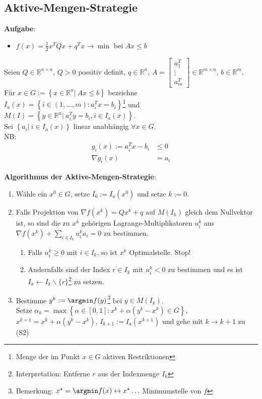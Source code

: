 \subsection{Aktive-Mengen-Strategie}
\textbf{Aufgabe}:
\begin{itemize}
  \item[] $f(x) = \frac12 x^TQx+q^Tx\rightarrow\min$ bei $Ax\le b$
\end{itemize}
Seien $Q\in\mathbb{R}^{n\times n}$, $Q>0$ possitiv definit, $q\in\mathbb{R}^n$, $A=\begin{bmatrix}a_1^T\\\vdots\\ a_m^T\end{bmatrix}\in\mathbb{R}^{m\times n}$, $b\in\mathbb{R}^m$.\\
Für $x\in G:=\left\{x\in\mathbb{R}^n|\ Ax\le b \right\}$ bezeichne $I_a(x)=\left\{i\in(1,\ldots,m):a_i^Tx=b_i\right\}$\footnote{Menge der im Punkt $x\in G$ aktiven Restriktionen} und
$M(I) = \left\{y\in\mathbb{R}^n|\ a_i^Ty=b_i, i\in I_a(x) \right\}$.\\
Sei $\left\{a_i|\ i\in I_a(x) \right\}$ linear unabhängig $\forall x\in G$.\\
\ac{NB}:
\begin{align*}
  g_i(x) := a_i^Tx -b_i & \le 0\\
  \nabla g_i(x) & = a_i
\end{align*}

\textbf{Algorithmus der Aktive-Mengen-Strategie}:
\begin{enumerate}[label=(S\arabic*)]
  \item Wähle ein $x^0\in G$, setze $I_0:=I_a(x^0)$ und setze $k:=0$.
  \item Falls Projektion von $\nabla f(x^k)=Qx^k+q$ auf $M(I_k)$ gleich dem Nullvektor ist, so sind die zu $x^k$ gehörigen Lagrange-Multiplikatoren
  $u_i^k$ aus $\nabla f(x^k)+\sum\limits_{i\in I_k}u_i^ka_i=0$ zu bestimmen.
  \begin{enumerate}[label=(S2\alph*)]
    \item Falls $u_i^k\ge 0$ mit $i\in I_k$, so ist $x^k$ Optimalstelle. Stop!
    \item Andernfalls sind der Index $r\in I_k$ mit $u_i^k<0$ zu bestimmen und es ist $I_k\leftarrow I_k\backslash\{r\}$\footnote{Interpretation: Entferne $r$ aus der Indexmenge $I_k$}
    zu setzen.
  \end{enumerate}
  \item Bestimme $y^k:=\argmin f(y)$\footnote{Bemerkung: $x^{\star}=\argmin f(x) \leftrightarrow x^{\star}\ldots$ Minimumstelle von $f$} bei $y\in
  M(I_k)$.\\
  		Setze $\alpha_k=\max\left\{\alpha\in[0,1]:x^k+\alpha(y^k-x^k)\in G\right\}$, $x^{k+1}=x^k+\alpha(y^k-x^k)$, $I_{k+1}:=I_a(x^{k+1})$ und gehe mit
  		$k\rightarrow k+1$ zu (S2)
\end{enumerate}

